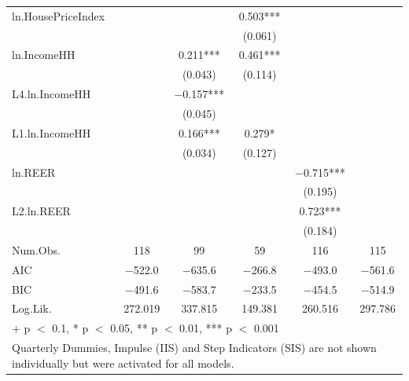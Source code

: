 \begin{table}
{\begin{tabular}[t]{lccccc}
ln.HousePriceIndex &  &  & \num{0.503}*** &  & \\
 &  &  & (\num{0.061}) &  & \\
ln.IncomeHH &  & \num{0.211}*** & \num{0.461}*** &  & \\
 &  & (\num{0.043}) & (\num{0.114}) &  & \\
L4.ln.IncomeHH &  & \num{-0.157}*** &  &  & \\
 &  & (\num{0.045}) &  &  & \\
L1.ln.IncomeHH &  & \num{0.166}*** & \num{0.279}* &  & \\
 &  & (\num{0.034}) & (\num{0.127}) &  & \\
ln.REER &  &  &  & \num{-0.715}*** & \\
 &  &  &  & (\num{0.195}) & \\
L2.ln.REER &  &  &  & \num{0.723}*** & \\
 &  &  &  & (\num{0.184}) & \\
\midrule
Num.Obs. & \num{118} & \num{99} & \num{59} & \num{116} & \num{115}\\
AIC & \num{-522.0} & \num{-635.6} & \num{-266.8} & \num{-493.0} & \num{-561.6}\\
BIC & \num{-491.6} & \num{-583.7} & \num{-233.5} & \num{-454.5} & \num{-514.9}\\
Log.Lik. & \num{272.019} & \num{337.815} & \num{149.381} & \num{260.516} & \num{297.786}\\
\bottomrule
\multicolumn{6}{l}{\rule{0pt}{1em}+ p $<$ 0.1, * p $<$ 0.05, ** p $<$ 0.01, *** p $<$ 0.001}\\
\multicolumn{6}{l}{\rule{0pt}{1em}Quarterly Dummies, Impulse (IIS) and Step Indicators (SIS) are not shown individually but were activated for all models.}\\
\end{tabular}}
\end{table}

